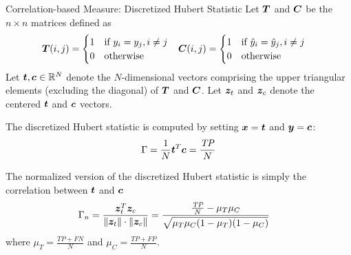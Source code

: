 \begin{frame}{Correlation-based Measure: Discretized Hubert Statistic}
Let ${\boldsymbol T}$ and ${\boldsymbol C}$ be the $n \times n$ matrices def\/{i}ned as
\begin{align*}
  {\boldsymbol T}(i,j) & =
  \begin{cases}
    1 & \text{if } y_i = y_{j}, i \ne j\\
    0 & \text{otherwise}
  \end{cases} &
  {\boldsymbol C}(i,j) & =
  \begin{cases}
    1 & \text{if } \hat{y}_i = \hat{y}_{j}, i \ne j\\
    0 & \text{otherwise}
 \end{cases}
\end{align*}
Let ${\boldsymbol t}, {\boldsymbol c} \in {\mathord{\mathbb R}}^N$ denote the $N$-dimensional vectors
comprising the upper triangular elements (excluding the diagonal)
of ${\boldsymbol T}$ and ${\boldsymbol C}$.
Let ${\boldsymbol z}_t$ and ${\boldsymbol z}_c$ denote the centered ${\boldsymbol t}$ and ${\boldsymbol c}$
vectors.

\medskip
The discretized Hubert statistic is computed
by setting ${\boldsymbol x} = {\boldsymbol t}$ and ${\boldsymbol y} = {\boldsymbol c}$:
\begin{align*}
  \Gamma = \frac{1}{N} {\boldsymbol t}^T{\boldsymbol c} = \frac{\mathit{TP}}{N}
\end{align*}

\medskip
The
normalized version of the discretized Hubert statistic is simply
the correlation between ${\boldsymbol t}$ and ${\boldsymbol c}$
\begin{align*}
  \Gamma_n &
  = \frac{{\boldsymbol z}_t^T{\boldsymbol z}_c}
  {\left\lVert{\boldsymbol z}_t\right\rVert\cdot \left\lVert{\boldsymbol z}_c\right\rVert} 
=\frac{\tfrac{\mathit{TP}}{N} - \mu_T \mu_C}
  {\sqrt{\mu_T\mu_C (1-\mu_T)(1-\mu_C)}}
\end{align*}
where $\mu_T = \tfrac{\mathit{TP}+\mathit{FN}}{N}$ and $\mu_C =
\tfrac{\mathit{TP}+\mathit{FP}}{N}$.
\end{frame}

\ifdefined\wox \begin{frame} \titlepage \end{frame} \fi

